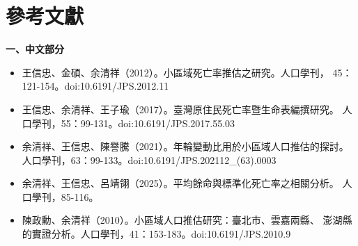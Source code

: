 \documentclass[UTF8, fontset=macnew, a4paper, 12pt]{ctexart}
\begin{document}
\vspace{10pt}
\section*{參考文獻}

\small
\noindent\textbf{一、中文部分}
\begin{itemize}[leftmargin=2em, label={}, itemsep=3pt]
  \item[] 王信忠、金碩、余清祥（2012）。小區域死亡率推估之研究。人口學刊，
        45：121-154。doi:10.6191/JPS.2012.11
  \item[] 王信忠、余清祥、王子瑜（2017）。臺灣原住民死亡率暨生命表編撰研究。
        人口學刊，55：99-131。doi:10.6191/JPS.2017.55.03
  \item[] 余清祥、王信忠、陳譽騰（2021）。年輪變動比用於小區域人口推估的探討。
        人口學刊，63：99-133。doi:10.6191/JPS.202112\_(63).0003
  \item[] 余清祥、王信忠、呂靖翎（2025）。平均餘命與標準化死亡率之相關分析。
        人口學刊，85-116。
  \item[] 陳政勳、余清祥（2010）。小區域人口推估研究：臺北市、雲嘉兩縣、
        澎湖縣的實證分析。人口學刊，41：153-183。doi:10.6191/JPS.2010.9
\end{itemize}
\end{document}
